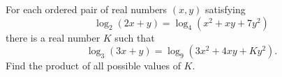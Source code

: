 For each ordered pair of real numbers $(x,y)$ satisfying\[ \log_2(2x+y) = \log_4(x^2+xy+7y^2) \]there is a real number $K$ such that\[ \log_3(3x+y) = \log_9(3x^2+4xy+Ky^2). \]Find the product of all possible values of $K$.